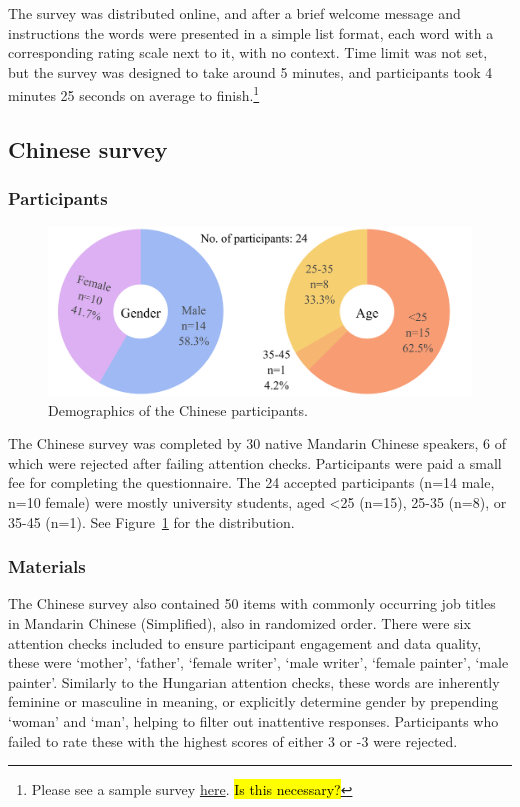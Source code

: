\documentclass[11pt]{article}
\newcommand{\zh}[1]{\simplifiedchinesefont{#1}\rmfamily}
\begin{document}
The survey was distributed online, and after a brief welcome message and instructions the words were presented in a simple list format, each word with a corresponding rating scale next to it, with no context. Time limit was not set, but the survey was designed to take around 5 minutes, and participants took 4 minutes 25 seconds on average to finish.\footnote{Please see a sample survey \href{https://htmlpreview.github.io/?}{here}. \hl{Is this necessary?}} 



\subsection{Chinese survey}

\subsubsection{Participants}

\begin{figure}[!ht]
  \centering
  \includegraphics[width=\linewidth]{../demographics_zh}
  \caption{Demographics of the Chinese participants.}
  \label{fig:demographics_zh}
\end{figure}


The Chinese survey was completed by 30 native Mandarin Chinese speakers, 6 of which were rejected after failing attention checks. Participants were paid a small fee for completing the questionnaire. The 24 accepted participants (n=14 male, n=10 female) were mostly university students, aged <25 (n=15), 25-35 (n=8), or 35-45 (n=1). See Figure~\ref{fig:demographics_zh} for the distribution.

\subsubsection{Materials}

The Chinese survey also contained 50 items with commonly occurring job titles in Mandarin Chinese (Simplified), also in randomized order. There were six attention checks included to ensure participant engagement and data quality, these were \zh{妈妈} `mother', \zh{爸爸} `father', \zh{女作家} `female writer', \zh{男作家} `male writer', \zh{女画家} `female painter', \zh{男画家} `male painter'. Similarly to the Hungarian attention checks, these words are inherently feminine or masculine in meaning, or explicitly determine gender by prepending \zh{女} `woman' and \zh{男} `man', helping to filter out inattentive responses. Participants who failed to rate these with the highest scores of either 3 or -3 were rejected.
\end{document}
